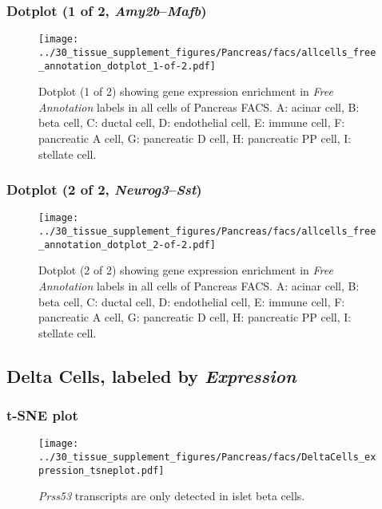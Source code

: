 \clearpage

\subsubsection{Dotplot (1 of 2, \emph{Amy2b}--\emph{Mafb})}
\begin{figure}[h]
\centering
\texttt{[image: ../30\_tissue\_supplement\_figures/Pancreas/facs/allcells\_free\_annotation\_dotplot\_1-of-2.pdf]}

\caption{ Dotplot (1 of 2)  showing gene expression enrichment in \emph{Free Annotation} labels in all cells of Pancreas FACS. A: acinar cell, B: beta cell, C: ductal cell, D: endothelial cell, E: immune cell, F: pancreatic A cell, G: pancreatic D cell, H: pancreatic PP cell, I: stellate cell.}
\end{figure}


\clearpage

\subsubsection{Dotplot (2 of 2, \emph{Neurog3}--\emph{Sst})}
\begin{figure}[h]
\centering
\texttt{[image: ../30\_tissue\_supplement\_figures/Pancreas/facs/allcells\_free\_annotation\_dotplot\_2-of-2.pdf]}

\caption{ Dotplot (2 of 2)  showing gene expression enrichment in \emph{Free Annotation} labels in all cells of Pancreas FACS. A: acinar cell, B: beta cell, C: ductal cell, D: endothelial cell, E: immune cell, F: pancreatic A cell, G: pancreatic D cell, H: pancreatic PP cell, I: stellate cell.}
\end{figure}


\clearpage

\subsection{Delta Cells, labeled by \emph{Expression}}

\clearpage
\subsubsection{t-SNE plot}
\begin{figure}[h]
\centering
\texttt{[image: ../30\_tissue\_supplement\_figures/Pancreas/facs/DeltaCells\_expression\_tsneplot.pdf]}

\caption{\emph{Prss53} transcripts are only detected in islet beta cells.
}
\end{figure}


